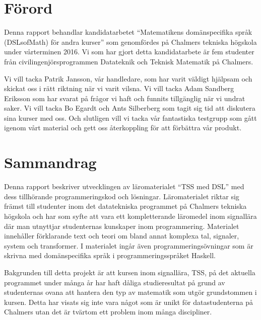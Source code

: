 \documentclass[12pt,a4paper,twoside,openright]{article}
\date{\today}
\begin{document}



\setlength{\parskip}{2mm}
\setlength{\parindent}{0pt}

\section*{Förord}
Denna rapport behandlar kandidatarbetet ``Matematikens domänspecifika
språk (DSLsofMath) för andra kurser'' som genomfördes på Chalmers
tekniska högskola under vårterminen 2016. Vi som har gjort detta
kandidatarbete är fem studenter från civilingenjörsprogrammen
Datateknik och Teknisk Matematik på Chalmers.

Vi vill tacka Patrik Jansson, vår handledare, som har varit väldigt
hjälpsam och skickat oss i rätt riktning när vi varit vilsna. Vi vill
tacka Adam Sandberg Eriksson som har svarat på frågor vi haft och
funnits tillgänglig när vi undrat saker. Vi vill tacka Bo Egardt och
Ants Silberberg som tagit sig tid att diskutera sina kurser med
oss. Och slutligen vill vi tacka vår fantastiska testgrupp som gått
igenom vårt material och gett oss återkoppling för att förbättra vår
produkt.

\newpage

\thispagestyle{plain}

\section*{Sammandrag}
Denna rapport beskriver utvecklingen av läromaterialet ``TSS med DSL''
med dess tillhörande programmeringskod och lösningar. Läromaterialet
riktar sig främst till studenter inom det datatekniska programmet på
Chalmers tekniska högskola och har som syfte att vara ett
kompletterande läromedel inom signallära där man utnyttjar
studenternas kunskaper inom programmering. Materialet innehåller
förklarande text och teori om bland annat komplexa tal, signaler,
system och transformer. I materialet ingår även programmeringsövningar
som är skrivna med domänspecifika språk i programmeringsspråket
\gls{Haskell}.

Bakgrunden till detta projekt är att kursen inom signallära, TSS, på
det aktuella programmet under många år har haft dåliga studieresultat
på grund av studenternas ovana att hantera den typ av matematik som
utgör grundstommen i kursen. Detta har visats sig inte vara något som
är unikt för datastudenterna på Chalmers utan det är tvärtom ett
problem inom många discipliner.
\end{document}
